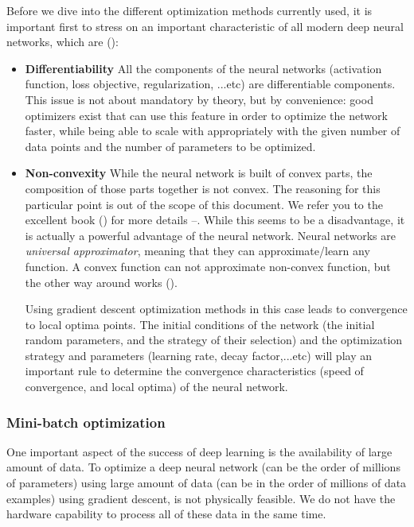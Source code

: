 Before we dive into the different optimization methods currently used, it is important first to stress on an important characteristic of all modern deep neural networks, which are (\citep{Goodfellow-et-al-2016}):
\begin{itemize}[noitemsep]
    \item \textbf{Differentiability} All the components of the neural networks (activation function, loss objective, regularization, ...etc) are differentiable components. This issue is not about mandatory by theory, but by convenience: good optimizers exist that can use this feature in order to optimize the network faster, while being able to scale with appropriately with the given number of data points and the number of parameters to be optimized.
    \item \textbf{Non-convexity} While the neural network is built of convex parts, the composition of those parts together is not convex. The reasoning for this particular point is out of the scope of this document. We refer you to the excellent book (\citep{Goodfellow-et-al-2016}) for more details --. While this seems to be a disadvantage, it is actually a powerful advantage of the neural network. Neural networks are \textit{universal approximator}, meaning that they can approximate/learn any function. A convex function can not approximate non-convex function, but the other way around works (\citep{lecture_nn_optimization}).

    Using gradient descent optimization methods in this case leads to convergence to local optima points. The initial conditions of the network (the initial random parameters, and the strategy of their selection) and the optimization strategy and parameters (learning rate, decay factor,...etc) will play an important rule to determine the convergence characteristics (speed of convergence, and local optima) of the neural network.
\end{itemize}

\subsubsection{Mini-batch optimization}
\par One important aspect of the success of deep learning is the availability of large amount of data. To optimize a deep neural network (can be the order of millions of parameters) using large amount of data (can be in the order of millions of data examples) using gradient descent, is not physically feasible. We do not have the hardware capability to process all of these data in the same time.

